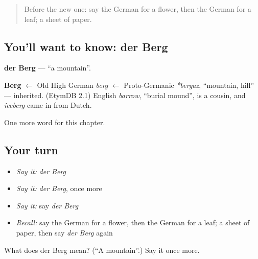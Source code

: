 \begin{quote}
Before the new one: say the German for a flower, then the German for a leaf; a sheet of paper.
\end{quote}

\subsection*{You'll want to know: der Berg}
\textbf{der Berg} — \textquotedblleft{}a mountain\textquotedblright{}.

\begin{cousinweb}
\textbf{Berg} $\leftarrow$ Old High German \emph{berg} $\leftarrow$ Proto-Germanic \emph{*bergaz}, \textquotedblleft{}mountain, hill\textquotedblright{} — inherited. (EtymDB 2.1) English \emph{barrow}, \textquotedblleft{}burial mound\textquotedblright{}, is a cousin, and \emph{iceberg} came in from Dutch.
\end{cousinweb}

\begin{grammarlens}[title={What you've built}]
One more word for this chapter.
\end{grammarlens}

\subsection*{Your turn}
\begin{itemize}
\raggedright
  \item \emph{Say it:} \emph{der Berg}
  \item \emph{Say it:} \emph{der Berg}, once more
  \item \emph{Say it:} say \emph{der Berg}
  \item \emph{Recall:} say the German for a flower, then the German for a leaf; a sheet of paper, then say \emph{der Berg} again
\end{itemize}

\begin{tcolorbox}[breakable,colback=teal!4,colframe=teal!35!black,title={Before you move on}]
What does der Berg mean? (\textquotedblleft{}A mountain\textquotedblright{}.) Say it once more.
\end{tcolorbox}
